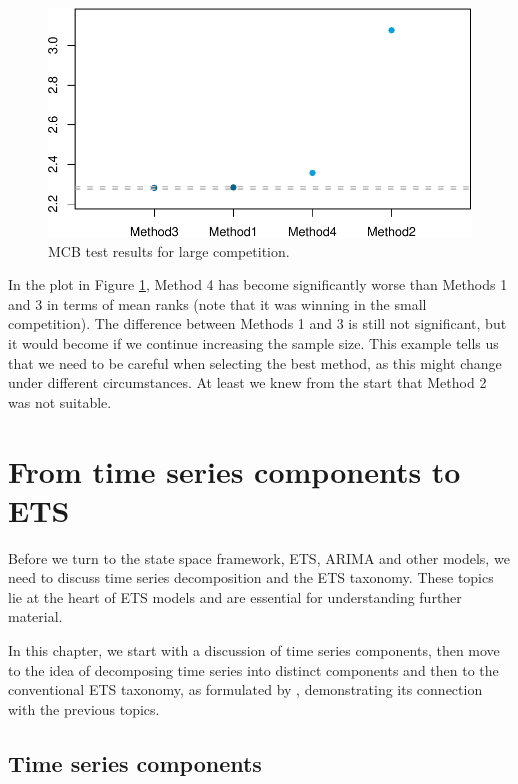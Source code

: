 \documentclass[
]{book}
\theoremstyle{definition}
\theoremstyle{definition}
\theoremstyle{definition}
\theoremstyle{definition}
\theoremstyle{remark}
\begin{document}
\begin{figure}
\centering
\includegraphics{Svetunkov--2022----ADAM_files/figure-latex/mcbForCompetitionLarge-1.pdf}
\caption{\label{fig:mcbForCompetitionLarge}MCB test results for large competition.}
\end{figure}

In the plot in Figure \ref{fig:mcbForCompetitionLarge}, Method 4 has become significantly worse than Methods 1 and 3 in terms of mean ranks (note that it was winning in the small competition). The difference between Methods 1 and 3 is still not significant, but it would become if we continue increasing the sample size. This example tells us that we need to be careful when selecting the best method, as this might change under different circumstances. At least we knew from the start that Method 2 was not suitable.

\hypertarget{tsDecomposition}{%
\chapter{From time series components to ETS}\label{tsDecomposition}}

Before we turn to the state space framework, ETS, ARIMA and other models, we need to discuss time series decomposition and the ETS taxonomy. These topics lie at the heart of ETS models and are essential for understanding further material.

In this chapter, we start with a discussion of time series components, then move to the idea of decomposing time series into distinct components and then to the conventional ETS taxonomy, as formulated by \citet{Hyndman2008b}, demonstrating its connection with the previous topics.

\hypertarget{tsComponents}{%
\section{Time series components}\label{tsComponents}}
\end{document}
